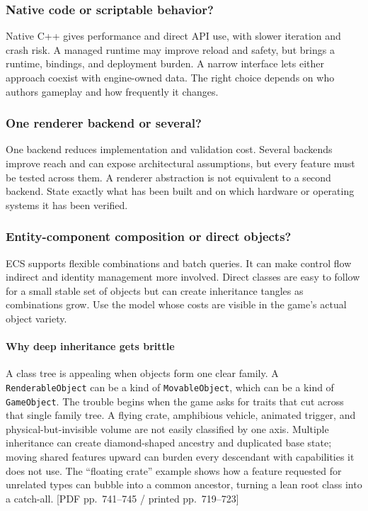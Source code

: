 \subsubsection{Native code or scriptable behavior?}\label{06-engine-ii-ch041-native-code-or-scriptable-behavior}

Native C++ gives performance and direct API use, with slower iteration and crash risk. A managed runtime may improve reload and safety, but brings a runtime, bindings, and deployment burden. A narrow interface lets either approach coexist with engine-owned data. The right choice depends on who authors gameplay and how frequently it changes.

\subsubsection{One renderer backend or several?}\label{06-engine-ii-ch041-one-renderer-backend-or-several}

One backend reduces implementation and validation cost. Several backends improve reach and can expose architectural assumptions, but every feature must be tested across them. A renderer abstraction is not equivalent to a second backend. State exactly what has been built and on which hardware or operating systems it has been verified.

\subsubsection{Entity-component composition or direct objects?}\label{06-engine-ii-ch041-entity-component-composition-or-direct-objects}

ECS supports flexible combinations and batch queries. It can make control flow indirect and identity management more involved. Direct classes are easy to follow for a small stable set of objects but can create inheritance tangles as combinations grow. Use the model whose costs are visible in the game's actual object variety.

\paragraph{Why deep inheritance gets brittle}\label{06-engine-ii-ch041-why-deep-inheritance-gets-brittle}

A class tree is appealing when objects form one clear family. A \texttt{RenderableObject} can be a kind of \texttt{MovableObject}, which can be a kind of \texttt{GameObject}. The trouble begins when the game asks for traits that cut across that single family tree. A flying crate, amphibious vehicle, animated trigger, and physical-but-invisible volume are not easily classified by one axis. Multiple inheritance can create diamond-shaped ancestry and duplicated base state; moving shared features upward can burden every descendant with capabilities it does not use. The ``floating crate'' example shows how a feature requested for unrelated types can bubble into a common ancestor, turning a lean root class into a catch-all. {[}PDF pp.~741--745 / printed pp.~719--723{]}

